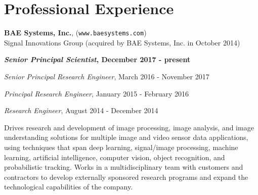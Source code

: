 \section{\sc Professional Experience} %


{\bf BAE Systems, Inc.}, (\texttt{www.baesystems.com})\\
Signal Innovations Group (acquired by BAE Systems, Inc. in October 2014)
\begin{list1}

\item[] \textbf{\textit{Senior Principal Scientist}, December 2017 - present}
\item[] {\em Senior Principal Research Engineer}, March 2016 - November 2017
\item[] {\em Principal Research Engineer}, January 2015 - February 2016
\item[] {\em Research Engineer}, August 2014 - December 2014
\item[] Drives research and development of image processing, image analysis, and image understanding solutions for multiple image and video sensor data applications, using techniques that span deep learning, signal/image processing, machine learning, artificial intelligence, computer vision, object recognition, and probabilistic tracking.  Works in a multidisciplinary team with customers and contractors to develop externally sponsored research programs and expand the technological capabilities of the company.
 
\end{list1}


%

